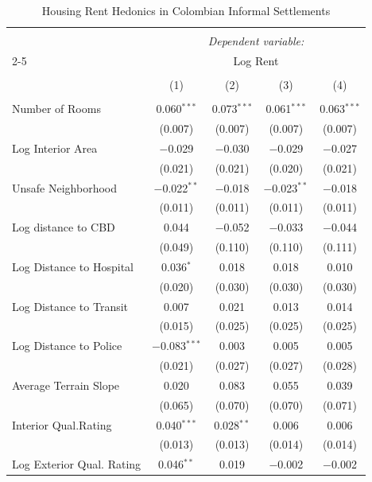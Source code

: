 
\begin{table}[H] \centering 
  \caption{Housing Rent Hedonics in Colombian Informal Settlements} 
  \label{reg_TABLE3} 
\scriptsize 
\begin{tabular}{@{\extracolsep{-7pt}}lcccc} 
\\[-1.8ex]\hline 
\hline \\[-1.8ex] 
 & \multicolumn{4}{c}{\textit{Dependent variable:}} \\ 
\cline{2-5} 
 & \multicolumn{4}{c}{Log Rent} \\ 
\\[-1.8ex] & (1) & (2) & (3) & (4)\\ 
\hline \\[-1.8ex] 
 Number of Rooms & 0.060$^{***}$ & 0.073$^{***}$ & 0.061$^{***}$ & 0.063$^{***}$ \\ 
  & (0.007) & (0.007) & (0.007) & (0.007) \\ 
  Log Interior Area & $-$0.029 & $-$0.030 & $-$0.029 & $-$0.027 \\ 
  & (0.021) & (0.021) & (0.020) & (0.021) \\ 
  Unsafe Neighborhood & $-$0.022$^{**}$ & $-$0.018 & $-$0.023$^{**}$ & $-$0.018 \\ 
  & (0.011) & (0.011) & (0.011) & (0.011) \\ 
  Log distance to CBD & 0.044 & $-$0.052 & $-$0.033 & $-$0.044 \\ 
  & (0.049) & (0.110) & (0.110) & (0.111) \\ 
  Log Distance to Hospital & 0.036$^{*}$ & 0.018 & 0.018 & 0.010 \\ 
  & (0.020) & (0.030) & (0.030) & (0.030) \\ 
  Log Distance to Transit & 0.007 & 0.021 & 0.013 & 0.014 \\ 
  & (0.015) & (0.025) & (0.025) & (0.025) \\ 
  Log Distance to Police & $-$0.083$^{***}$ & 0.003 & 0.005 & 0.005 \\ 
  & (0.021) & (0.027) & (0.027) & (0.028) \\ 
  Average Terrain Slope & 0.020 & 0.083 & 0.055 & 0.039 \\ 
  & (0.065) & (0.070) & (0.070) & (0.071) \\ 
  Interior Qual.Rating & 0.040$^{***}$ & 0.028$^{**}$ & 0.006 & 0.006 \\ 
  & (0.013) & (0.013) & (0.014) & (0.014) \\ 
  Log Exterior Qual. Rating & 0.046$^{**}$ & 0.019 & $-$0.002 & $-$0.002 \\ 

\end{tabular}
\end{table}

